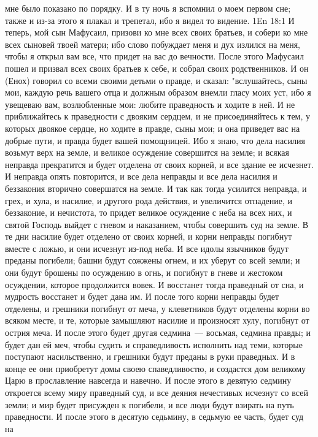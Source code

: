 мне было показано по порядку.
И в ту ночь я вспомнил о моем первом сне; также и из-за этого я
плакал и трепетал, ибо я видел то видение.
\vs 1En 18:1
И теперь, мой сын Мафусаил, призови ко мне всех своих братьев, и
собери ко мне всех сыновей твоей матери; ибо слово побуждает меня и дух излился
на меня, чтобы я открыл вам все, что придет на вас до вечности.
После этого Мафусаил пошел и призвал всех своих братьев к себе, и
собрал своих родственников.
И он (Енох) говорил со всеми своими детьми о правде, и сказал:
"вслушайтесь, сыны мои, каждую речь вашего отца и должным образом внемли гласу
моих уст, ибо я увещеваю вам, возлюбленные мои: любите праведность и ходите в
ней.
И не приближайтесь к праведности с двояким сердцем, и не
присоединяйтесь к тем, у которых двоякое сердце, но ходите в правде, сыны мои;
и она приведет вас на добрые пути, и правда будет вашей помощницей.
Ибо я знаю, что дела насилия возьмут верх на земле, и великое осуждение
совершится на земле; и всякая неправда прекратится и будет отделена от своих
корней, и все здание ее исчезнет.
И неправда опять повторится, и все дела неправды и все дела насилия и
беззакония вторично совершатся на земле.
И так как тогда усилится неправда, и грех, и хула, и насилие, и другого
рода действия, и увеличится отпадение, и беззаконие, и нечистота, то придет
великое осуждение с неба на всех них, и святой Господь выйдет с гневом и
наказанием, чтобы совершить суд на земле.
В те дни насилие будет отделено от своих корней, и корни неправды
погибнут вместе с ложью, и они исчезнут из-под неба.
И все идолы язычников будут преданы погибели; башни будут сожжены
огнем, и их уберут со всей земли; и они будут брошены по осуждению в огнь, и
погибнут в гневе и жестоком осуждении, которое продолжится вовек.
И восстанет тогда праведный от сна, и мудрость восстанет и будет дана
им.
И после того корни неправды будет отделены, и грешники погибнут от
меча, у клеветников будут отделены корни во всяком месте, и те, которые
замышляют насилие и произносят хулу, погибнут от острия меча.
И после этого будет другая седмина~--- восьмая, седмина правды; и будет
дан ей меч, чтобы судить и справедливость исполнить над теми, которые поступают
насильственно, и грешники будут преданы в руки праведных.
И в конце ее они приобретут домы своею спаведливостю, и создастся дом
великому Царю в прославление навсегда и навечно.
И после этого в девятую седмину откроется всему миру праведный суд, и
все деяния нечестивых исчезнут со всей земли; и мир будет присужден к погибели,
и все люди будут взирать на путь праведности.
И после этого в десятую седьмину, в седьмую ее часть, будет суд на
